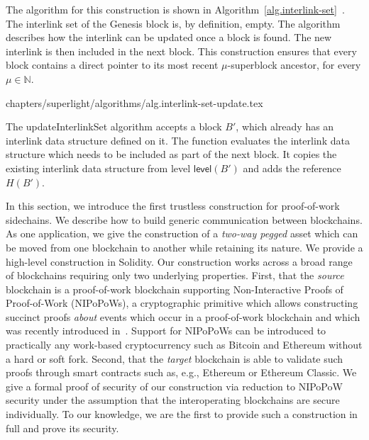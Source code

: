 The algorithm for this construction is shown in
Algorithm~\ref{alg.interlink-set}~\cite{compactsuperblocks}. The
interlink set of the Genesis block is, by definition, empty. The algorithm
describes how the interlink can be updated once a block is found. The new
interlink is then included in the next block. This construction ensures that
every block contains a direct pointer to its most recent $\mu$-superblock
ancestor, for every $\mu \in \mathbb{N}$.

{chapters/superlight/algorithms/alg.interlink-set-update.tex}

The \textsf{updateInterlinkSet} algorithm accepts a block $B'$, which already has an
interlink data structure defined on it. The function evaluates the
interlink data structure which needs to be included as part of the next block.
It copies the existing interlink data structure from level $\textsf{level}(B')$
and adds the reference $H(B')$.


\ifdraft
{}
In this section, we introduce the first
trustless construction for proof-of-work sidechains. We describe how to build
generic communication between blockchains. As one application, we give the
construction of a \emph{two-way pegged} asset which can be moved from one
blockchain to another while retaining its nature. We provide a high-level
construction in Solidity. Our construction works across a broad range of
blockchains requiring only two underlying properties. First, that the
\emph{source} blockchain is a proof-of-work blockchain supporting
Non-Interactive Proofs of Proof-of-Work (NIPoPoWs), a cryptographic primitive
which allows constructing succinct proofs \emph{about} events which occur in a
proof-of-work blockchain and which was recently introduced in~\cite{nipopows}.
Support for NIPoPoWs can be introduced to practically any
work-based cryptocurrency such as Bitcoin and Ethereum without a hard or soft
fork. Second, that the \emph{target} blockchain is able to validate such proofs
through smart contracts such as, e.g., Ethereum or Ethereum
Classic.
We give a formal proof of security of our construction via
reduction to NIPoPoW security under the assumption that the interoperating
blockchains are secure individually.
To our knowledge, we are the first to
provide such a construction in
full and prove its security.
\fi

